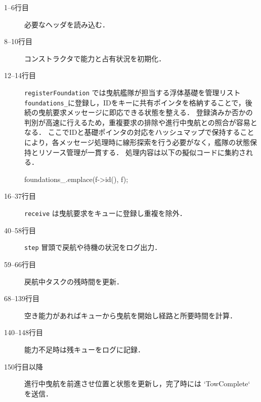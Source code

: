 \documentclass[10pt,letterpaper]{jsarticle}
\begin{document}
\begin{description}
  \item[1--6行目] 必要なヘッダを読み込む．
  \item[8--10行目] コンストラクタで能力と占有状況を初期化．
  \item[12--14行目] \texttt{registerFoundation} では曳航艦隊が担当する浮体基礎を管理リスト\texttt{foundations\_}に登録し，IDをキーに共有ポインタを格納することで，後続の曳航要求メッセージに即応できる状態を整える．
  登録済みか否かの判別が高速に行えるため，重複要求の排除や進行中曳航との照合が容易となる．
  ここでIDと基礎ポインタの対応をハッシュマップで保持することにより，各メッセージ処理時に線形探索を行う必要がなく，艦隊の状態保持とリソース管理が一貫する．
  処理内容は以下の擬似コードに集約される．
\begin{cppcode}
foundations_.emplace(f->id(), f);
\end{cppcode}
  \item[16--37行目] \texttt{receive} は曳航要求をキューに登録し重複を除外．
  \item[40--58行目] \texttt{step} 冒頭で戻航や待機の状況をログ出力．
  \item[59--66行目] 戻航中タスクの残時間を更新．
  \item[68--139行目] 空き能力があればキューから曳航を開始し経路と所要時間を計算．
  \item[140--148行目] 能力不足時は残キューをログに記録．
  \item[150行目以降] 進行中曳航を前進させ位置と状態を更新し，完了時には `TowComplete` を送信．
\end{description}
\end{document}
